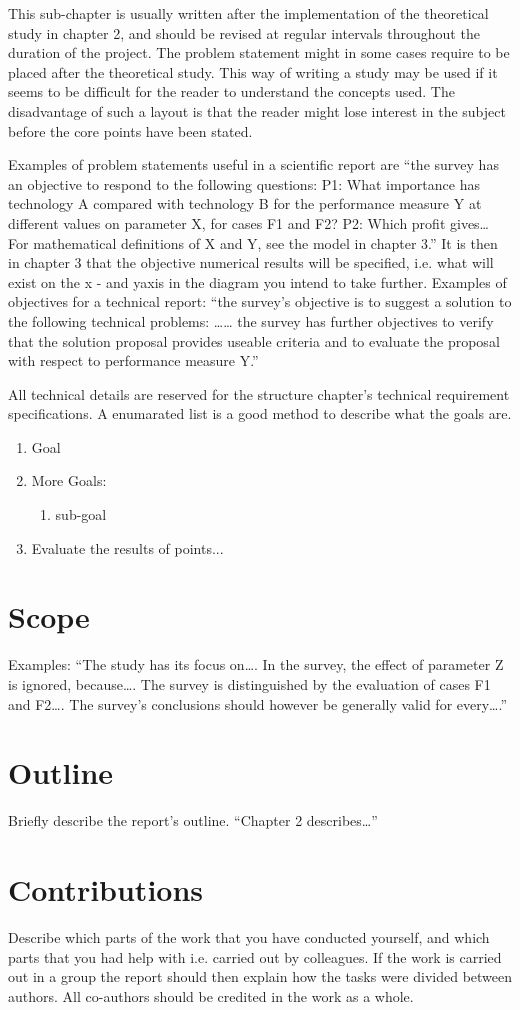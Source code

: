 This sub-chapter is usually written after the implementation of the
theoretical study in chapter 2, and should be revised at regular intervals
throughout the duration of the project. The problem statement might in
some cases require to be placed after the theoretical study. This way of
writing a study may be used if it seems to be difficult for the reader to
understand the concepts used. The disadvantage of such a layout is that
the reader might lose interest in the subject before the core points have
been stated.

Examples of problem statements useful in a scientific report are “the
survey has an objective to respond to the following questions: P1: What
importance has technology A compared with technology B for the
performance measure Y at different values on parameter X, for cases F1
and F2? P2: Which profit gives… For mathematical definitions of X and
Y, see the model in chapter 3.” It is then in chapter 3 that the objective
numerical results will be specified, i.e. what will exist on the x - and yaxis in the diagram you intend to take further.
Examples of objectives for a technical report: “the survey's objective is to
suggest a solution to the following technical problems: …… the survey
has further objectives to verify that the solution proposal provides
useable criteria and to evaluate the proposal with respect to
performance measure Y.”

All technical details are reserved for the structure chapter's technical
requirement specifications. A enumarated list is a good method to describe what the goals are.
\begin{enumerate}
    \item Goal
    \item More Goals:
    \begin{enumerate}[label*=\arabic*.]
        \item sub-goal
    \end{enumerate} 
    \item Evaluate the results of points...
\end{enumerate}

\section{Scope}
Examples: “The study has its focus on…. In the survey, the effect of
parameter Z is ignored, because…. The survey is distinguished by the
evaluation of cases F1 and F2…. The survey's conclusions should
however be generally valid for every….”
\section{Outline}
Briefly describe the report's outline. “Chapter 2 describes…” 
\section{Contributions}
Describe which parts of the work that you have conducted yourself, and
which parts that you had help with i.e. carried out by colleagues. If the
work is carried out in a group the report should then explain how the
tasks were divided between authors. All co-authors should be credited
in the work as a whole. 